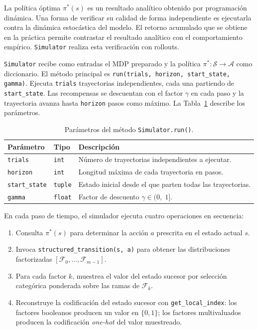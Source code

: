 La política óptima $\pi^*(s)$ es un resultado analítico obtenido por programación
dinámica. Una forma de verificar su calidad de forma independiente es ejecutarla
contra la dinámica estocástica del modelo. El retorno acumulado que se obtiene en
la práctica permite contrastar el resultado analítico con el comportamiento empírico.
\texttt{Simulator} realiza esta verificación con rollouts.

\texttt{Simulator} recibe como entradas el MDP preparado y la política
$\pi^* : \mathcal{S} \to \mathcal{A}$ como diccionario. El método principal es
\texttt{run(trials, horizon, start\_state, gamma)}. Ejecuta \texttt{trials}
trayectorias independientes, cada una partiendo de \texttt{start\_state}. Las
recompensas se descuentan con el factor $\gamma$ en cada paso y la trayectoria
avanza hasta \texttt{horizon} pasos como máximo. La
Tabla~\ref{tab:simulator-parametros} describe los parámetros.

\begin{table}[ht]
\centering
\caption{Parámetros del método \texttt{Simulator.run()}.}
\label{tab:simulator-parametros}
\begin{tabular}{llp{7.0cm}}
\hline
\textbf{Parámetro} & \textbf{Tipo} & \textbf{Descripción} \\
\hline
\texttt{trials}       & \texttt{int}   & Número de trayectorias independientes a ejecutar. \\
\texttt{horizon}      & \texttt{int}   & Longitud máxima de cada trayectoria en pasos. \\
\texttt{start\_state} & \texttt{tuple} & Estado inicial desde el que parten todas las trayectorias. \\
\texttt{gamma}        & \texttt{float} & Factor de descuento $\gamma \in (0,\; 1]$. \\
\hline
\end{tabular}
\end{table}

En cada paso de tiempo, el simulador ejecuta cuatro operaciones en secuencia:

\begin{enumerate}
    \item Consulta $\pi^*(s)$ para determinar la acción $a$ prescrita en el estado
        actual $s$.
    \item Invoca \texttt{structured\_transition(s, a)} para obtener las distribuciones
        factorizadas $[\mathcal{F}_0, \ldots, \mathcal{F}_{m-1}]$.
    \item Para cada factor $k$, muestrea el valor del estado sucesor por
        selección categórica ponderada sobre las ramas de $\mathcal{F}_k$.
    \item Reconstruye la codificación del estado sucesor con
        \texttt{get\_local\_index}: los factores booleanos producen un valor en
        $\{0, 1\}$; los factores multivaluados producen la codificación
        \textit{one-hot} del valor muestreado.
\end{enumerate}

